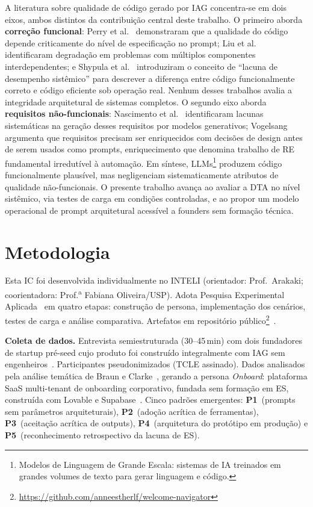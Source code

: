 \documentclass[sigconf]{acmart}
\begin{document}
A literatura sobre qualidade de código gerado por IAG concentra-se em dois eixos,
ambos distintos da contribuição central deste trabalho. O primeiro aborda
\textbf{correção funcional}: Perry et al.~\cite{Perry2023} demonstraram que a
qualidade do código depende criticamente do nível de especificação no prompt; Liu et
al.~\cite{Liu2023} identificaram degradação em problemas com múltiplos componentes
interdependentes; e Shypula et al.~\cite{Shypula2023} introduziram o conceito de
``lacuna de desempenho sistêmico'' para descrever a diferença entre código
funcionalmente correto e código eficiente sob operação real. Nenhum desses trabalhos
avalia a integridade arquitetural de sistemas completos. O segundo eixo aborda
\textbf{requisitos não-funcionais}: Nascimento et al.~\cite{Nascimento2023}
identificaram lacunas sistemáticas na geração desses requisitos por modelos
generativos; Vogelsang~\cite{Vogelsang2024} argumenta que requisitos precisam ser
enriquecidos com decisões de design antes de serem usados como prompts,
enriquecimento que denomina trabalho de RE fundamental irredutível à automação. Em
síntese, LLMs\footnote{Modelos de Linguagem de Grande Escala: sistemas de IA
treinados em grandes volumes de texto para gerar linguagem e código.} produzem código
funcionalmente plausível, mas negligenciam sistematicamente atributos de qualidade
não-funcionais. O presente trabalho avança ao avaliar a DTA no nível sistêmico, via testes de carga em condições controladas, e ao propor um modelo operacional de
prompt arquitetural acessível a founders sem formação técnica.

\section{Metodologia}

Esta IC foi desenvolvida individualmente no INTELI (orientador: Prof.\ Arakaki;
coorientadora: Prof.\textsuperscript{a} Fabiana Oliveira/USP). Adota Pesquisa
Experimental Aplicada~\cite{Wohlin2012} em quatro etapas: construção de persona,
implementação dos cenários, testes de carga e análise comparativa. Artefatos em
repositório público\footnote{\url{https://github.com/anneestherlf/welcome-navigator}}~\cite{WelcomeNavigator2025}.

\textbf{Coleta de dados.} Entrevista semiestruturada (30--45\,min) com dois
fundadores de startup pré-seed cujo produto foi construído integralmente com IAG
sem engenheiros~\cite{Ries2012}. Participantes pseudonimizados (TCLE assinado).
Dados analisados pela análise temática de Braun e Clarke~\cite{Braun2006}, gerando
a persona \textit{Onboard}: plataforma SaaS multi-tenant de onboarding corporativo,
fundada sem formação em ES, construída com Lovable e Supabase~\cite{Supabase2024}.
Cinco padrões emergentes: \textbf{P1}~(prompts sem parâmetros arquiteturais),
\textbf{P2}~(adoção acrítica de ferramentas), \textbf{P3}~(aceitação acrítica de
outputs), \textbf{P4}~(arquitetura do protótipo em produção) e \textbf{P5}~(reconhecimento
retrospectivo da lacuna de ES).
\end{document}
